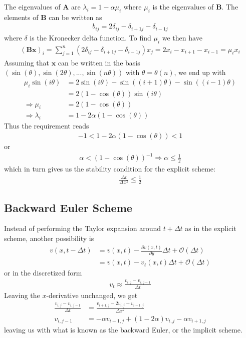 \documentclass[twoside, 11pt]{article}
\begin{document}
		The eigenvalues of $\mathbf{A}$ are  $\lambda_i = 1 - \alpha \mu_i$ where $\mu_i$ is the eigenvalues of $\mathbf{B}$. The elements of $\mathbf{B}$ can be written as
		\begin{align*}
			b_{ij} = 2\delta_{ij} -\delta_{i+1j} - \delta_{i-1j}
		\end{align*}
		where $\delta$ is the Kronecker delta function. To find $\mu_i$ we then have
		\begin{align*}
			(\mathbf{B}\mathbf{x})_i =\sum_{j=1}^n(2\delta_{ij} -\delta_{i+1j} - \delta_{i-1j})x_j = 2x_i-x_{i+1} - x_{i-1}= \mu_ix_i
		\end{align*}
		Assuming that $\mathbf{x}$ can be written in the basis $(\sin(\theta), \sin(2\theta),..., \sin(n\theta))$ with $\theta = \theta(n)$, we end up with
		\begin{align*}
			\mu_i\sin(i\theta) &= 2\sin(i\theta) - \sin((i+1)\theta) - \sin((i-1)\theta) \\
			&= 2(1-\cos(\theta))\sin(i\theta) \\
			\Rightarrow \mu_i &= 2(1-\cos(\theta)) \\
			\Rightarrow \lambda_i &= 1-2\alpha(1-\cos(\theta))
		\end{align*}
		Thus the requirement reads
		\begin{align*}
			-1 < 1 - 2\alpha(1-\cos(\theta)) < 1
		\end{align*}
		or
		\begin{align*}
			\alpha < (1 - \cos(\theta))^{-1} \Rightarrow \alpha \leq \frac{1}{2}
		\end{align*}
		which in turn gives us the stability condition for the explicit scheme:
		\begin{align}
			\frac{\Delta t}{\Delta x^2} \leq \frac{1}{2} \label{eq: forward euler stability}
		\end{align}
	
	\subsection{Backward Euler Scheme}
		Instead of performing the Taylor expansion around $t+\Delta t$ as in the explicit scheme, another possibility is
		\begin{align*}
			v(x, t-\Delta t) &= v(x, t) - \frac{\partial v(x, t)}{\partial y} \Delta t + \mathcal{O}(\Delta t) \\
			&= v(x, t) - v_t(x, t)\Delta t + \mathcal{O}(\Delta t)
		\end{align*}
		or in the discretized form
		\begin{align*}
			v_t \approx \frac{v_{i,j} - v_{i,j-1}}{\Delta t}
		\end{align*}
		Leaving the $x$-derivative unchanged, we get
		\begin{align}
			\frac{v_{i,j} - v_{i, j-1}}{\Delta t} &= \frac{v_{i+1,j} - 2v_{i,j} + v_{i-1,j}}{\Delta x^2} \nonumber \\
			v_{i,j-1} &= -\alpha v_{i-1,j} +(1-2\alpha)v_{i,j} -\alpha v_{i+1,j} \label{eq: backward euler}
		\end{align}
		leaving us with what is known as the backward Euler, or the implicit scheme.
		
\end{document}
